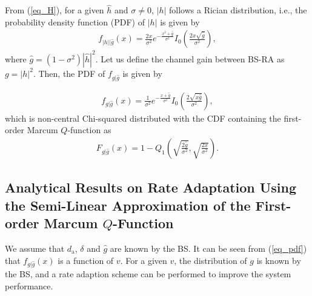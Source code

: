 From (\ref{eq_H}), for a given $\hat{h}$ and $\sigma \neq 0$, $|h|$ follows a Rician distribution, i.e., the  probability density function (PDF) of $|h|$ is given by 
\begin{align}
    f_{|h|\big|\hat{g}}(x) = \frac{2x}{\sigma^2}e^{-\frac{x^2+\hat{g}}{\sigma^2}}I_0\left(\frac{2x\sqrt{\hat{g}}}{\sigma^2}\right),
\end{align}
where $\hat{g} = (1-\sigma^2)|\hat{h}|^2$. Let us define the channel gain between BS-RA as $ g = |{h}|^2$. Then, the PDF of $f_{g|\hat{g}}$ is given by

\begin{align}\label{eq_pdf}
    f_{g|\hat{g}}(x) = \frac{1}{\sigma^2}e^{-\frac{x+\hat{g}}{\sigma^2}}I_0\left(\frac{2\sqrt{x\hat{g}}}{\sigma^2}\right),
\end{align}
which is non-central Chi-squared distributed with the CDF containing the first-order Marcum $Q$-function as
\begin{align}\label{eq_cdf}
    F_{g|\hat{g}}(x) = 1 - Q_1\left( \sqrt{\frac{2\hat{g}}{\sigma^2}}, \sqrt{\frac{2x}{\sigma^2}}  \right).
\end{align}



\subsection{Analytical Results on Rate Adaptation Using the Semi-Linear Approximation of the First-order Marcum $Q$-Function}\label{In Section III.C,}
We assume that $d_\text{a}$, $\delta $ and $\hat{g}$ are known by the BS. It can be seen from (\ref{eq_pdf}) that $f_{g|\hat{g}}(x)$ is a function of $v$. For a given $v$, the distribution of $g$ is known by the BS, and a rate adaption scheme can be performed to improve the system performance.

